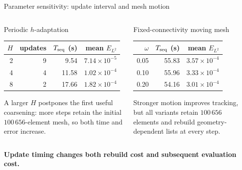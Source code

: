 \documentclass[aspectratio=169,11pt]{beamer}
\begin{document}
\begin{frame}{Parameter sensitivity: update interval and mesh motion}
  \begin{columns}[T,onlytextwidth]
      \begin{block}{Periodic $h$-adaptation}
        \centering\footnotesize
        \begin{tabular}{rrrr}
          \toprule
          $H$ & updates & $T_{\rm seq}$ (s) & mean $E_{L^2}$\\
          \midrule
          2 & 9 & 9.54 & $7.14\times10^{-5}$\\
          4 & 4 & 11.58 & $1.02\times10^{-4}$\\
          8 & 2 & 17.66 & $1.82\times10^{-4}$\\
          \bottomrule
        \end{tabular}

        \vspace{0.18cm}
        \raggedright\scriptsize
        A larger $H$ postpones the first useful coarsening: more steps retain
        the initial $100\,656$-element mesh, so both time and error increase.
      \end{block}
      \begin{block}{Fixed-connectivity moving mesh}
        \centering\footnotesize
        \begin{tabular}{rrr}
          \toprule
          $\omega$ & $T_{\rm seq}$ (s) & mean $E_{L^2}$\\
          \midrule
          0.05 & 55.83 & $3.57\times10^{-4}$\\
          0.10 & 55.96 & $3.33\times10^{-4}$\\
          0.20 & 54.16 & $3.01\times10^{-4}$\\
          \bottomrule
        \end{tabular}

        \vspace{0.18cm}
        \raggedright\scriptsize
        Stronger motion improves tracking, but all variants retain $100\,656$
        elements and rebuild geometry-dependent lists at every step.
      \end{block}
  \end{columns}

  \vspace{0.10cm}
  \centering\footnotesize\color{navy}\bfseries
  Update timing changes both rebuild cost and subsequent evaluation cost.
\end{frame}
\end{document}
